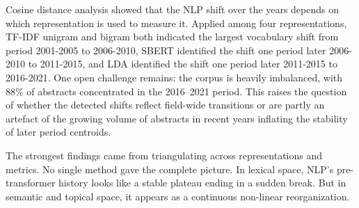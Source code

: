 
Cosine distance analysis showed that the NLP shift over the years depends on which representation is used to measure it. Applied among four representations, TF-IDF unigram and bigram both indicated the largest vocabulary shift from period 2001-2005 to 2006-2010, SBERT identified the shift one period later 2006-2010 to 2011-2015, and LDA identified the shift one period later 2011-2015 to 2016-2021. One open challenge remains: the corpus is heavily imbalanced, with 88\% of abstracts concentrated in the 2016--2021 period. This raises the question of whether the detected shifts reflect field-wide transitions or are partly an artefact of the growing volume of abstracts in recent years inflating the stability of later period centroids.


 The strongest findings came from triangulating across representations and metrics. No single method gave the complete picture. In lexical space, NLP's pre-transformer history looks like a stable plateau ending in a sudden break. But in semantic and topical space, it appears as a continuous non-linear reorganization.





